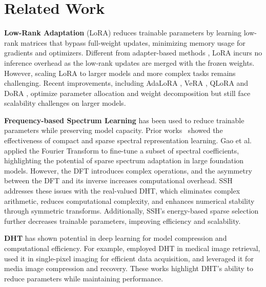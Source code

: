 \section{Related Work}

\noindent \textbf{Low-Rank Adaptation} (LoRA) \cite{hu2022lora} reduces trainable parameters by learning low-rank matrices that bypass full-weight updates, minimizing memory usage for gradients and optimizers. 
Different from adapter-based methods \cite{he2021towards, pfeiffer2020adapterfusion, lin2020exploring, liao2023make, liao2023parameter}, LoRA incurs no inference overhead as the low-rank updates are merged with the frozen weights. However, scaling LoRA to larger models and more complex tasks remains challenging.
Recent improvements, including AdaLoRA \cite{zhang2303adaptive}, VeRA \cite{kopiczko2023vera}, QLoRA \cite{dettmers2024qlora} and DoRA \cite{liu2024dora}, optimize parameter allocation and weight decomposition but still face scalability challenges on larger models. 


\noindent \textbf{Frequency-based Spectrum Learning} has been used to reduce trainable parameters while preserving model capacity. Prior works~\cite{xu2020learning,tang2022rethinking,yang2016exact} showed the effectiveness of compact and sparse spectral representation learning. Gao et al.~\cite{gao2024parameter} applied the Fourier Transform to fine-tune a subset of spectral coefficients, highlighting the potential of sparse spectrum adaptation in large foundation models. However, the DFT introduces complex operations, and the asymmetry between the DFT and its inverse increases computational overhead.
SSH addresses these issues with the real-valued DHT, which eliminates complex arithmetic, reduces computational complexity, and enhances numerical stability through symmetric transforms. Additionally, SSH’s energy-based sparse selection further decreases trainable parameters, improving efficiency and scalability.




\noindent \textbf{DHT} has shown potential in deep learning for model compression and computational efficiency. For example, \cite{rani2024content} employed DHT in medical image retrieval, \cite{ma2021high} used it in single-pixel imaging for efficient data acquisition, and \cite{coutinho2021low} leveraged it for media image compression and recovery. These works highlight DHT’s ability to reduce parameters while maintaining performance. 
